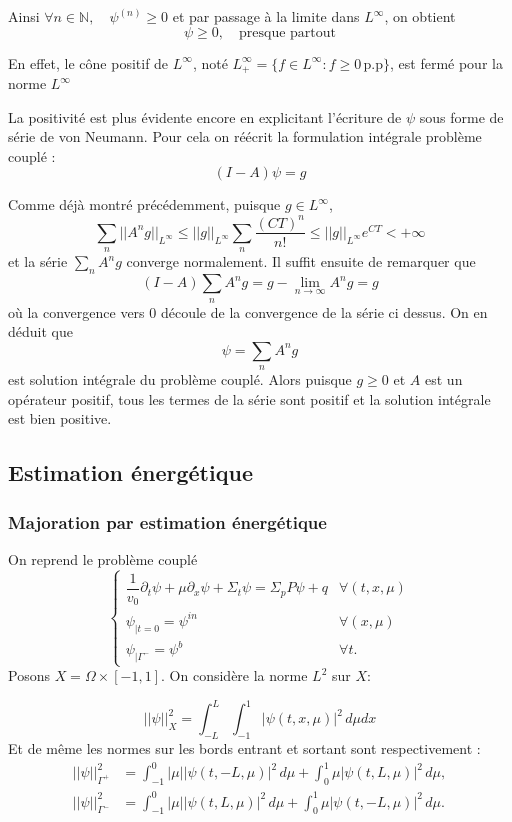 \documentclass{article}
\begin{document}
Ainsi \(\forall n \in \mathbb{N}, \quad \psi^{(n)} \ge 0\) et par passage à la limite dans \(L^{\infty}\), on obtient 
\[ \psi \ge 0, \quad \text{presque partout}\]

En effet, le cône positif de \(L^{\infty}\), noté \(L^{\infty}_+ = \{f\in L^{\infty} : f \ge 0 \, \text{p.p}\}\), est fermé pour la norme \(L^{\infty}\)

\medskip
La positivité est plus évidente encore en explicitant l'écriture de \(\psi\) sous forme de série de von Neumann. Pour cela on réécrit la formulation intégrale problème couplé :
\begin{equation}
    (I - A)\psi = g
\end{equation}

Comme déjà montré précédemment, puisque \(g \in L^{\infty}\), 
\[
\sum_n ||A^ng||_{L^{\infty}}
 \le ||g||_{L^{\infty}}\sum_n \frac{(CT)^n}{n!} 
 \le ||g||_{L^{\infty}}e^{CT} < +\infty
 \]
et la série \(\sum_n A^ng\) converge normalement. Il suffit ensuite de remarquer que 
\[
(I-A)\sum_n A^ng = g - \lim_{n \to \infty} A^ng = g
\]
où la convergence vers 0 découle de la convergence de la série ci dessus. On en déduit que 
\[\psi = \sum_n A^ng \]
est solution intégrale du problème couplé. Alors puisque \(g \ge 0\) et \(A\) est un opérateur positif, tous les termes de la série sont positif et la solution intégrale est bien positive. 

\subsection{Estimation énergétique }
\subsubsection{Majoration par estimation énergétique}
On reprend le problème couplé
\[
\begin{cases}
    \dfrac1{v_0}\partial_t\psi + \mu\partial_x\psi + \Sigma_t\psi = \Sigma_pP\psi+q  &\forall(t,x,\mu)\\
    \psi_{|t=0} =\psi^{in} &\forall(x,\mu) \\
    \psi_{|\Gamma^-} =\psi^b & \forall t.
\end{cases}
\]
Posons \(X = \Omega \times [-1,1]\). On considère la norme \(L^2\) sur \(X\):

\[||\psi||_X^2 = \int_{-L}^L\!\int_{-1}^1 |\psi(t,x,\mu)|^2\,d\mu dx\]
Et de même les normes sur les bords entrant et sortant sont respectivement : 
\begin{align*}
    ||\psi||_{\Gamma^+}^2 &= \int_{-1}^0 |\mu||\psi(t,-L,\mu)|^2\,d\mu + \int_0^1 \mu|\psi(t,L,\mu)|^2\,d\mu, \\
    ||\psi||_{\Gamma^-}^2 &= \int_{-1}^0 |\mu||\psi(t,L,\mu)|^2\,d\mu + \int_0^1 \mu|\psi(t,-L,\mu)|^2\,d\mu.
\end{align*}
\end{document}
